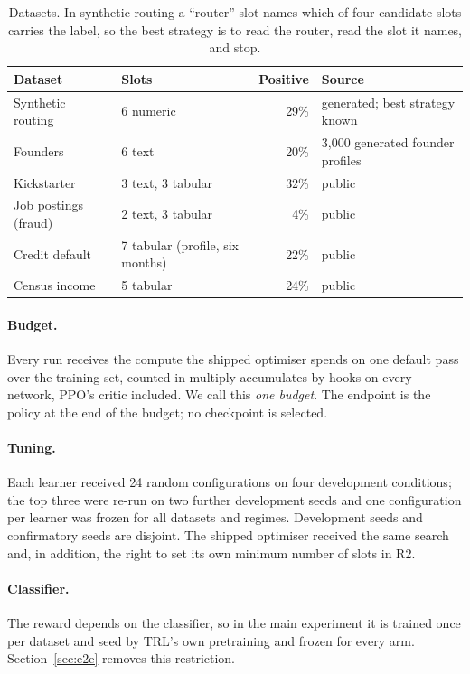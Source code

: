 \documentclass[11pt,a4paper]{article}
\begin{document}
\begin{table}[t]
\centering\small
\begin{tabular}{llrl}
\toprule
Dataset & Slots & Positive & Source \\
\midrule
Synthetic routing & 6 numeric & 29\% & generated; best strategy known \\
Founders & 6 text & 20\% & 3{,}000 generated founder profiles \\
Kickstarter & 3 text, 3 tabular & 32\% & public \\
Job postings (fraud) & 2 text, 3 tabular & 4\% & public \\
Credit default & 7 tabular (profile, six months) & 22\% & public \\
Census income & 5 tabular & 24\% & public \\
\bottomrule
\end{tabular}
\caption{Datasets. In synthetic routing a ``router'' slot names which of four candidate slots carries the label,
so the best strategy is to read the router, read the slot it names, and stop.}
\label{tab:data}
\end{table}

\paragraph{Budget.} Every run receives the compute the shipped optimiser spends on one default pass over the
training set, counted in multiply-accumulates by hooks on every network, PPO's critic included. We call this
\emph{one budget}. The endpoint is the policy at the end of the budget; no checkpoint is selected.

\paragraph{Tuning.} Each learner received 24 random configurations on four development conditions; the top three
were re-run on two further development seeds and one configuration per learner was frozen for all datasets and
regimes. Development seeds and confirmatory seeds are disjoint. The shipped optimiser received the same search
and, in addition, the right to set its own minimum number of slots in R2.

\paragraph{Classifier.} The reward depends on the classifier, so in the main experiment it is trained once per
dataset and seed by TRL's own pretraining and frozen for every arm. Section~\ref{sec:e2e} removes this
restriction.
\end{document}
